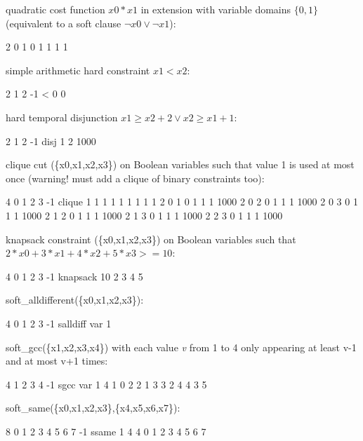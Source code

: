 \documentclass{article}
\begin{document}
\begin{DoxyItemize}
\item quadratic cost function $x0 * x1$ in extension with variable domains $\{0,1\}$ (equivalent to a soft clause $\neg x0 \vee \neg x1$)\-:
\begin{DoxyCode}
2 0 1 0 1 1 1 1 
\end{DoxyCode}

\item simple arithmetic hard constraint $x1 < x2$\-:
\begin{DoxyCode}
2 1 2 -1 < 0 0 
\end{DoxyCode}

\item hard temporal disjunction $x1 \geq x2 + 2 \vee x2 \geq x1 + 1$\-:
\begin{DoxyCode}
2 1 2 -1 disj 1 2 1000 
\end{DoxyCode}

\item clique cut (\{x0,x1,x2,x3\}) on Boolean variables such that value 1 is used at most once (warning! must add a clique of binary constraints too)\-:
\begin{DoxyCode}
4 0 1 2 3 -1 clique 1 1 1 1 1 1 1 1 1 
2 0 1 0 1 1 1 1000 
2 0 2 0 1 1 1 1000 
2 0 3 0 1 1 1 1000 
2 1 2 0 1 1 1 1000 
2 1 3 0 1 1 1 1000 
2 2 3 0 1 1 1 1000 
\end{DoxyCode}

\item knapsack constraint (\{x0,x1,x2,x3\}) on Boolean variables such that $2*x0 + 3*x1 + 4*x2 + 5*x3 >= 10$\-:
 \begin{DoxyCode}
4 0 1 2 3 -1 knapsack 10 2 3 4 5
\end{DoxyCode}
 
\item soft\-\_\-alldifferent(\{x0,x1,x2,x3\})\-:
\begin{DoxyCode}
4 0 1 2 3 -1 salldiff var 1 
\end{DoxyCode}

\item soft\-\_\-gcc(\{x1,x2,x3,x4\}) with each value {\itshape v} from 1 to 4 only appearing at least v-\/1 and at most v+1 times\-:
\begin{DoxyCode}
4 1 2 3 4 -1 sgcc var 1 4 1 0 2 2 1 3 3 2 4 4 3 5 
\end{DoxyCode}

\item soft\-\_\-same(\{x0,x1,x2,x3\},\{x4,x5,x6,x7\})\-:
\begin{DoxyCode}
8 0 1 2 3 4 5 6 7 -1 ssame 1 4 4 0 1 2 3 4 5 6 7 
\end{DoxyCode}


\end{DoxyItemize}
\end{document}
